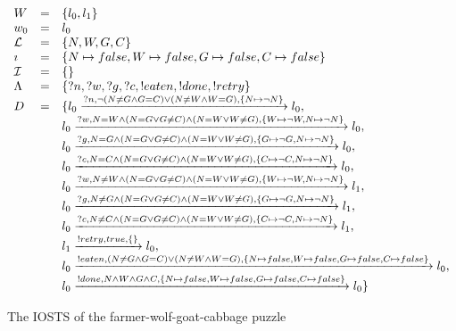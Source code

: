   \begin{figure}[ht]
  \begin{center}
  $\begin{array}{lcl}
  W & = & \{l_0, l_1\} \\
  w_0 & = & l_0 \\
  \mathcal{L} & = & \{N,W,G,C\} \\
  \imath & = & \{N \mapsto false, W \mapsto false, G \mapsto false, C \mapsto false\} \\
  \mathcal{I} & = & \{\} \\
  \Lambda & = & \{?n, ?w, ?g, ?c, !eaten, !done, !retry\} \\
  D & = & \{l_0\xrightarrow{?n, \neg(N \neq G \land G=C)\lor(N \neq W \land W=G), \{N \mapsto \neg N\}}l_0, \\
  & & l_0\xrightarrow{?w, N=W \land (N = G \lor G\neq C)\land (N = W \lor W\neq G), \{W \mapsto \neg W, N \mapsto \neg N\}}l_0,\\
  & & l_0\xrightarrow{?g, N=G \land (N = G \lor G\neq C)\land (N = W \lor W\neq G), \{G \mapsto \neg G, N \mapsto \neg N\}}l_0,\\
  & & l_0\xrightarrow{?c, N=C \land (N = G \lor G\neq C)\land (N = W \lor W\neq G), \{C \mapsto \neg C, N \mapsto \neg N\}}l_0,\\
  & & l_0\xrightarrow{?w, N\neq W \land (N = G \lor G\neq C)\land (N = W \lor W\neq G), \{W \mapsto \neg W, N \mapsto \neg N\}}l_1,\\
  & & l_0\xrightarrow{?g, N\neq G \land (N = G \lor G\neq C)\land (N = W \lor W\neq G), \{G \mapsto \neg G, N \mapsto \neg N\}}l_1,\\
  & & l_0\xrightarrow{?c, N\neq C \land (N = G \lor G\neq C)\land (N = W \lor W\neq G), \{C \mapsto \neg C, N \mapsto \neg N\}}l_1,\\
  & & l_1\xrightarrow{!retry,true,\{\}}l_0,\\
  & & l_0\xrightarrow{!eaten, (N \neq G \land G=C)\lor(N \neq W \land W=G), \{N \mapsto false, W \mapsto false, G \mapsto false, C \mapsto false\}}l_0, \\
  & & l_0\xrightarrow{!done, N \land W \land G \land C, \{N \mapsto false, W \mapsto false, G \mapsto false, C \mapsto false\}}l_0\}
  \end{array}$
  \end{center}
  \caption{The IOSTS of the farmer-wolf-goat-cabbage puzzle}
  \label{fig:sts-fwgc}
  \end{figure}

